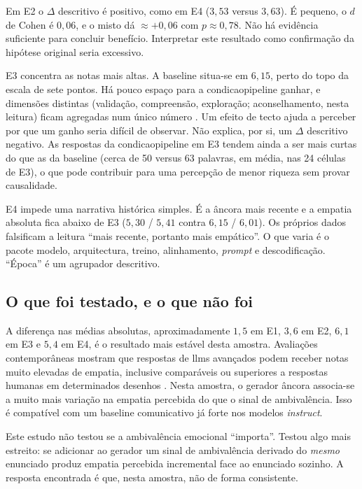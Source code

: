 Em E2 o \(\Delta\) descritivo é positivo, como em E4 (\(3{,}53\) versus \(3{,}63\)). É pequeno, o \(d\) de Cohen é \(0{,}06\), e o misto dá \(\approx +0{,}06\) com \(p \approx 0{,}78\). Não há evidência suficiente para concluir benefício. Interpretar este resultado como confirmação da hipótese original seria excessivo.

E3 concentra as notas mais altas. A \gls{baseline} situa-se em \(6{,}15\), perto do topo da escala de sete pontos. Há pouco espaço para a \gls{condicaopipeline} ganhar, e dimensões distintas (validação, compreensão, exploração; aconselhamento, nesta leitura) ficam agregadas num único número \parencite{Kumar2026EmpathicJudging, Sharma2020Empathy, Son2026EmotionalValidation}. Um efeito de tecto ajuda a perceber por que um ganho seria difícil de observar. Não explica, por si, um \(\Delta\) descritivo negativo. As respostas da \gls{condicaopipeline} em E3 tendem ainda a ser mais curtas do que as da \gls{baseline} (cerca de 50 versus 63 palavras, em média, nas 24 células de E3), o que pode contribuir para uma percepção de menor riqueza sem provar causalidade.

E4 impede uma narrativa histórica simples. É a âncora mais recente e a empatia absoluta fica abaixo de E3 (\(5{,}30\) / \(5{,}41\) contra \(6{,}15\) / \(6{,}01\)). Os próprios dados falsificam a leitura ``mais recente, portanto mais empático''. O que varia é o pacote modelo, arquitectura, treino, alinhamento, \textit{prompt} e descodificação. ``Época'' é um agrupador descritivo.

\subsection{O que foi testado, e o que não foi}
\label{subsec:disc_incremental}

A diferença nas médias absolutas, aproximadamente \(1{,}5\) em E1, \(3{,}6\) em E2, \(6{,}1\) em E3 e \(5{,}4\) em E4, é o resultado mais estável desta amostra. Avaliações contemporâneas mostram que respostas de \glspl{llm} avançados podem receber notas muito elevadas de empatia, inclusive comparáveis ou superiores a respostas humanas em determinados desenhos \parencite{Welivita2026HumansOrLLMs, Zhou2026TextEmotionEmpathy}. Nesta amostra, o gerador âncora associa-se a muito mais variação na empatia percebida do que o sinal de ambivalência. Isso é compatível com um baseline comunicativo já forte nos modelos \textit{instruct}.

Este estudo não testou se a ambivalência emocional ``importa''. Testou algo mais estreito: se adicionar ao gerador um sinal de ambivalência derivado do \textit{mesmo} enunciado produz empatia percebida incremental face ao enunciado sozinho. A resposta encontrada é que, nesta amostra, não de forma consistente.

